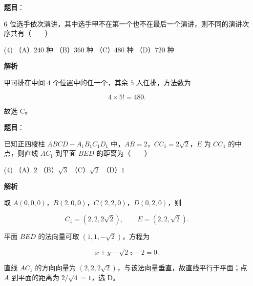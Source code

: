 \begin{answer}

\textbf{题目}：

$6$ 位选手依次演讲，其中选手甲不在第一个也不在最后一个演讲，则不同的演讲次序共有\mbox{（　　）}

\begin{gkopts}(4)
\task （A）$240$ 种
\task （B）$360$ 种
\task （C）$480$ 种
\task （D）$720$ 种
\end{gkopts}

\textbf{解析}

甲可排在中间 $4$ 个位置中的任一个，其余 $5$ 人任排，方法数为

\nopagebreak[4]
\[
4\times5!=480.
\]

故选 C。


\end{answer}
\begin{answer}

\textbf{题目}：

已知正四棱柱 $ABCD-A_1B_1C_1D_1$ 中，$AB=2$，$CC_1=2\sqrt2$，$E$ 为 $CC_1$ 的中点，则直线 $AC_1$ 到平面 $BED$ 的距离为\mbox{（　　）}

\begin{gkopts}(4)
\task （A）$2$
\task （B）$\sqrt3$
\task （C）$\sqrt2$
\task （D）$1$
\end{gkopts}

\textbf{解析}

取 $A(0,0,0)$，$B(2,0,0)$，$C(2,2,0)$，$D(0,2,0)$，则

\nopagebreak[4]
\[
C_1=(2,2,2\sqrt2),\qquad E=(2,2,\sqrt2).
\]

平面 $BED$ 的法向量可取 $(1,1,-\sqrt2)$，方程为

\nopagebreak[4]
\[
x+y-\sqrt2z-2=0.
\]

直线 $AC_1$ 的方向向量为 $(2,2,2\sqrt2)$，与该法向量垂直，故直线平行于平面；点 $A$ 到平面的距离为 $2/\sqrt4=1$，选 D。


\end{answer}
